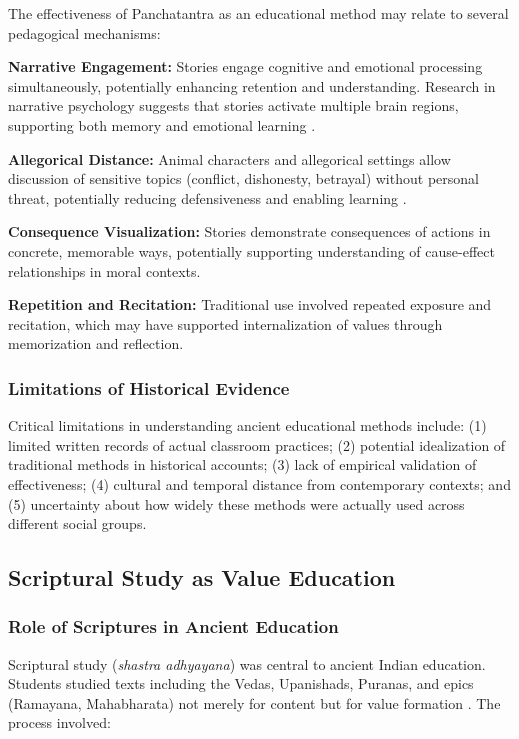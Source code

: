 \documentclass[12pt,a4paper,twocolumn]{article}
\begin{document}
The effectiveness of Panchatantra as an educational method may relate to several pedagogical mechanisms:

\textbf{Narrative Engagement:} Stories engage cognitive and emotional processing simultaneously, potentially enhancing retention and understanding. Research in narrative psychology suggests that stories activate multiple brain regions, supporting both memory and emotional learning \citep{Mar2011}.

\textbf{Allegorical Distance:} Animal characters and allegorical settings allow discussion of sensitive topics (conflict, dishonesty, betrayal) without personal threat, potentially reducing defensiveness and enabling learning \citep{Mishra2017}.

\textbf{Consequence Visualization:} Stories demonstrate consequences of actions in concrete, memorable ways, potentially supporting understanding of cause-effect relationships in moral contexts.

\textbf{Repetition and Recitation:} Traditional use involved repeated exposure and recitation, which may have supported internalization of values through memorization and reflection.

\subsubsection{Limitations of Historical Evidence}

Critical limitations in understanding ancient educational methods include: (1) limited written records of actual classroom practices; (2) potential idealization of traditional methods in historical accounts; (3) lack of empirical validation of effectiveness; (4) cultural and temporal distance from contemporary contexts; and (5) uncertainty about how widely these methods were actually used across different social groups.

\subsection{Scriptural Study as Value Education}

\subsubsection{Role of Scriptures in Ancient Education}

Scriptural study (\textit{shastra adhyayana}) was central to ancient Indian education. Students studied texts including the Vedas, Upanishads, Puranas, and epics (Ramayana, Mahabharata) not merely for content but for value formation \citep{Mookerji1947}. The process involved:
\end{document}
